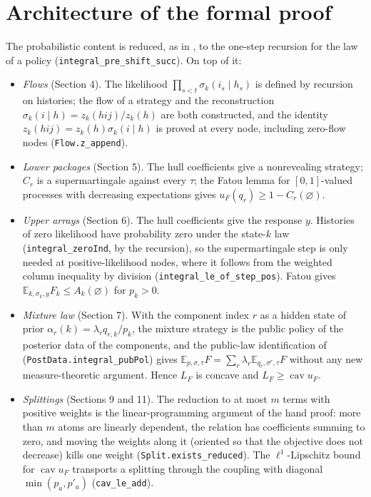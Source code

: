 \documentclass[11pt]{article}
\theoremstyle{definition}
\begin{document}
\section{Architecture of the formal proof}

The probabilistic content is reduced, as in \cite{Lean8}, to the one-step recursion for the law of a policy (\texttt{integral\_pre\_shift\_succ}). On top of it:
\begin{itemize}
\item \emph{Flows} (Section 4). The likelihood $\prod_{s<t}\sigma_k(i_s\mid h_s)$ is defined by recursion on histories; the flow of a strategy and the reconstruction $\sigma_k(i\mid h)=z_k(hij)/z_k(h)$ are both constructed, and the identity $z_k(hij)=z_k(h)\sigma_k(i\mid h)$ is proved at every node, including zero-flow nodes (\texttt{Flow.z\_append}).
\item \emph{Lower packages} (Section 5). The hull coefficients give a nonrevealing strategy; $C_r$ is a supermartingale against every $\tau$; the Fatou lemma for $[0,1]$-valued processes with decreasing expectations gives $u_F(q_r)\ge1-C_r(\varnothing)$.
\item \emph{Upper arrays} (Section 6). The hull coefficients give the response $y$. Histories of zero likelihood have probability zero under the state-$k$ law (\texttt{integral\_zeroInd}, by the recursion), so the supermartingale step is only needed at positive-likelihood nodes, where it follows from the weighted column inequality by division (\texttt{integral\_le\_of\_step\_pos}). Fatou gives $\mathbb E_{k,\sigma_k,y}F_k\le A_k(\varnothing)$ for $p_k>0$.
\item \emph{Mixture law} (Section 7). With the component index $r$ as a hidden state of prior $\alpha_r(k)=\lambda_rq_{r,k}/p_k$, the mixture strategy is the public policy of the posterior data of the components, and the public-law identification of \cite{Lean8} (\texttt{PostData.integral\_pubPol}) gives $\mathbb E_{p,\sigma,\tau}F=\sum_r\lambda_r\mathbb E_{q_r,\sigma^r,\tau}F$ without any new measure-theoretic argument. Hence $L_F$ is concave and $L_F\ge\operatorname{cav}u_F$.
\item \emph{Splittings} (Sections 9 and 11). The reduction to at most $m$ terms with positive weights is the linear-programming argument of the hand proof: more than $m$ atoms are linearly dependent, the relation has coefficients summing to zero, and moving the weights along it (oriented so that the objective does not decrease) kills one weight (\texttt{Split.exists\_reduced}). The $\ell^1$-Lipschitz bound for $\operatorname{cav}u_F$ transports a splitting through the coupling with diagonal $\min(p_a,p'_a)$ (\texttt{cav\_le\_add}).

\end{itemize}
\end{document}
